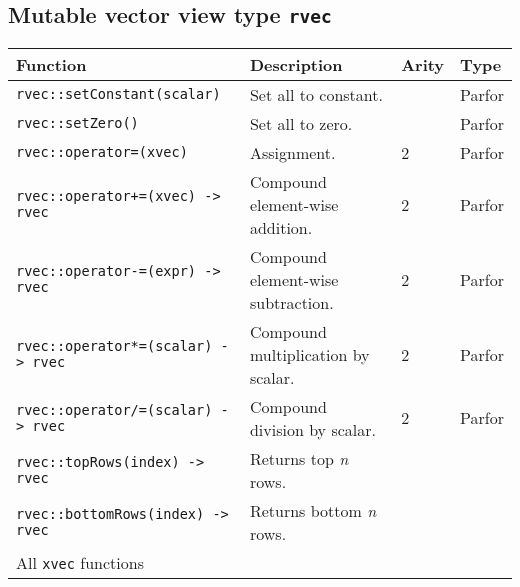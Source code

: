 \documentclass{article}
\begin{document}
\subsection*{Mutable vector view type \texttt{rvec}}
\begin{tabular}{|p{7.2cm}|p{5.8cm}|p{0.95cm}|p{1.15cm}|}
\hline
\textbf{Function} & \textbf{Description} & \textbf{Arity} & \textbf{Type}\\\hline
\lstinline|rvec::setConstant(scalar)| & Set all to constant. & & Parfor \\\hline
\lstinline|rvec::setZero()| & Set all to zero. & & Parfor \\\hline
\lstinline|rvec::operator=(xvec)| & Assignment. & 2 & Parfor \\\hline
\lstinline|rvec::operator+=(xvec) -> rvec| & Compound element-wise addition. & 2 & Parfor \\\hline
\lstinline|rvec::operator-=(expr) -> rvec| & Compound element-wise subtraction. & 2 & Parfor \\\hline
\lstinline|rvec::operator*=(scalar) -> rvec| & Compound multiplication by scalar. & 2 & Parfor \\\hline
\lstinline|rvec::operator/=(scalar) -> rvec| & Compound division by scalar. & 2 & Parfor \\\hline
\lstinline|rvec::topRows(index) -> rvec| & Returns top \textit{n} rows. & & \\\hline
\lstinline|rvec::bottomRows(index) -> rvec| & Returns bottom \textit{n} rows. & & \\\hline
All \lstinline|xvec| functions & & & \\\hline
\end{tabular}
\end{document}
